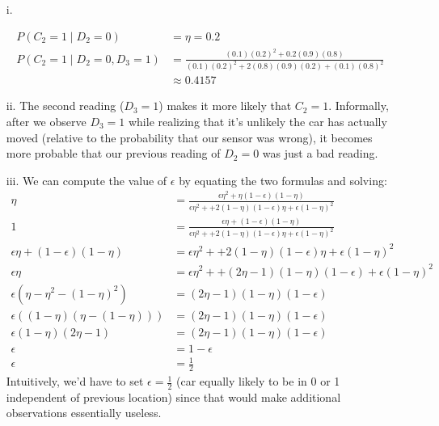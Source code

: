 \documentclass[11pt]{article}
\begin{document}
\begin{itemize}
	\item[i.] 
	
	\begin{align}
		P(C_2=1 \mid D_2=0)
			&= \eta = 0.2 \\
		P(C_2 = 1 \mid D_2=0, D_3=1)
			&= \frac{
					(0.1) (0.2)^2 + 0.2 (0.9)(0.8)
			}{
			(0.1) (0.2)^2 + 2 (0.8)(0.9)(0.2) + (0.1)(0.8)^2
		}\\
	&\approx 0.4157
	\end{align}
	
	\item[ii.] The second reading ($D_3=1$) makes it more likely that $C_2=1$. Informally, after we observe $D_3=1$ while realizing that it's unlikely the car has actually moved (relative to the probability that our sensor was wrong), it becomes more probable that our previous reading of $D_2=0$ was just a bad reading. 
	
	
	\item[iii.] We can compute the value of $\epsilon$ by equating the two formulas and solving:
	\begin{align}
	\eta &= \frac{\epsilon \eta^2 + \eta (1  - \epsilon) (1 - \eta)
	}{
		\epsilon \eta^2 +
		+2 (1-\eta)(1- \epsilon) \eta + \epsilon(1 - \eta)^2 
	}\\
	1 &=  \frac{\epsilon \eta + (1  - \epsilon) (1 - \eta)
	}{
		\epsilon \eta^2 +
		+2 (1-\eta)(1- \epsilon) \eta + \epsilon(1 - \eta)^2 
	} \\
	 \epsilon \eta + (1  - \epsilon) (1 - \eta)
	&= \epsilon \eta^2 +
	+2 (1-\eta)(1- \epsilon) \eta + \epsilon(1 - \eta)^2 
	\\
	\epsilon\eta 
		&=  \epsilon \eta^2 +
		+ (2\eta - 1) (1-\eta)(1- \epsilon) + \epsilon(1 - \eta)^2 \\
	\epsilon (\eta - \eta^2 - (1-\eta)^2)
		&= (2\eta - 1) (1-\eta)(1- \epsilon) \\
	\epsilon( (1 - \eta) (\eta - (1 - \eta))  )
		&= (2\eta - 1) (1-\eta)(1- \epsilon) \\
		\epsilon (1 - \eta) (2\eta - 1)
		&= (2\eta - 1) (1-\eta)(1- \epsilon) \\
		\epsilon &= 1 - \epsilon \\
		\epsilon &= \frac{1}{2}
	\end{align}
	Intuitively, we'd have to set $\epsilon = \tfrac{1}{2}$ (car equally likely to be in 0 or 1 independent of previous location) since that would make additional observations essentially useless. 
\end{itemize}
\end{document}
